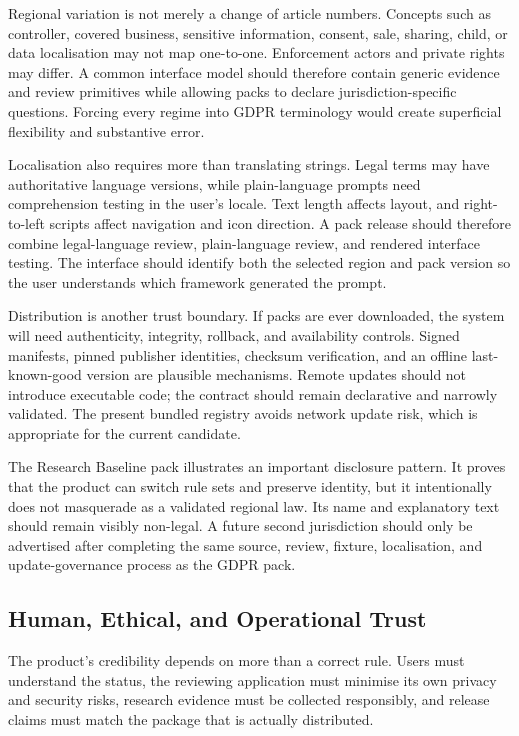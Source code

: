 Regional variation is not merely a change of article numbers. Concepts such as controller, covered business, sensitive information, consent, sale, sharing, child, or data localisation may not map one-to-one. Enforcement actors and private rights may differ. A common interface model should therefore contain generic evidence and review primitives while allowing packs to declare jurisdiction-specific questions. Forcing every regime into GDPR terminology would create superficial flexibility and substantive error.

Localisation also requires more than translating strings. Legal terms may have authoritative language versions, while plain-language prompts need comprehension testing in the user's locale. Text length affects layout, and right-to-left scripts affect navigation and icon direction. A pack release should therefore combine legal-language review, plain-language review, and rendered interface testing. The interface should identify both the selected region and pack version so the user understands which framework generated the prompt.

Distribution is another trust boundary. If packs are ever downloaded, the system will need authenticity, integrity, rollback, and availability controls. Signed manifests, pinned publisher identities, checksum verification, and an offline last-known-good version are plausible mechanisms. Remote updates should not introduce executable code; the contract should remain declarative and narrowly validated. The present bundled registry avoids network update risk, which is appropriate for the current candidate.

The Research Baseline pack illustrates an important disclosure pattern. It proves that the product can switch rule sets and preserve identity, but it intentionally does not masquerade as a validated regional law. Its name and explanatory text should remain visibly non-legal. A future second jurisdiction should only be advertised after completing the same source, review, fixture, localisation, and update-governance process as the GDPR pack.

\subsection{Human, Ethical, and Operational Trust}

The product's credibility depends on more than a correct rule. Users must understand the status, the reviewing application must minimise its own privacy and security risks, research evidence must be collected responsibly, and release claims must match the package that is actually distributed.

